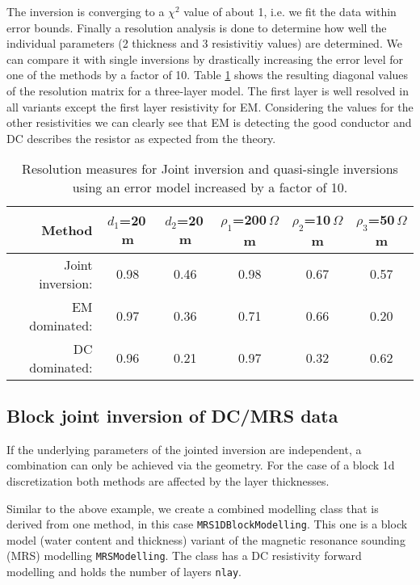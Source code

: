 The inversion is converging to a $\chi^2$ value of about 1, i.e. we fit the data within error bounds.
Finally a resolution analysis is done to determine how well the individual parameters (2 thickness and 3 resistivitiy values) are determined.
We can compare it with single inversions by drastically increasing the error level for one of the methods by a factor of 10.
Table \ref{tab:dcemresolution} shows the resulting diagonal values of the resolution matrix for a three-layer model.
The first layer is well resolved in all variants except the first layer resistivity for EM.
Considering the values for the other resistivities we can clearly see that EM is detecting the good conductor and DC describes the resistor as expected from the theory.

\begin{table}[h]%
\centering
\begin{tabular}{r|ccccc}
Method & $d_1$=20\,m & $d_2$=20\,m & $\rho_1$=200\,$\Omega$m & $\rho_2$=10\,$\Omega$m & $\rho_3$=50\,$\Omega$m \\ \hline
Joint inversion: & 0.98 & 0.46 & 0.98 & 0.67 & 0.57 \\
EM dominated:    & 0.97 & 0.36 & 0.71 & 0.66 & 0.20 \\
DC dominated:    & 0.96 & 0.21 & 0.97 & 0.32 & 0.62  
\end{tabular}
\caption{Resolution measures for Joint inversion and quasi-single inversions using an error model increased by a factor of 10.}\label{tab:dcemresolution}
\end{table}

\subsection{Block joint inversion of DC/MRS data}\label{sec:blockjoint}
If the underlying parameters of the jointed inversion are independent, a combination can only be achieved via the geometry.
For the case of a block 1d discretization both methods are affected by the layer thicknesses.

Similar to the above example, we create a combined modelling class that is derived from one method, in this case \lstinline|MRS1DBlockModelling|.
This one is a block model (water content and thickness) variant of the magnetic resonance sounding (MRS) modelling \lstinline|MRSModelling|.
The class has a DC resistivity forward modelling and holds the number of layers \lstinline|nlay|.

